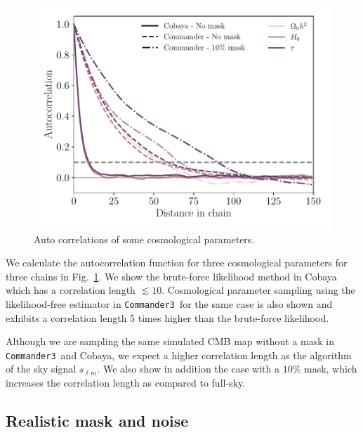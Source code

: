 \documentclass[twocolumn]{../common/aa}
\def\commanderthree{\texttt{Commander3}}
\begin{document}
\begin{figure}
	\centering
	\includegraphics[width=\linewidth]{figures/auto_correlation.pdf}
	\caption{\label{fig:autocorrelation}Auto correlations of some cosmological parameters.}
\end{figure}

We calculate the autocorrelation function for three cosmological parameters for three chains in Fig.~\ref{fig:autocorrelation}. We show the brute-force likelihood method in Cobaya which has a correlation length $\lesssim 10$. Cosmological parameter sampling using the likelihood-free estimator in \commanderthree\ for the same case is also shown and exhibits a correlation length 5 times higher than the brute-force likelihood.

Although we are sampling the same simulated CMB map without a mask in \commanderthree\ and Cobaya, we expect a higher correlation length as the algorithm of \citet{raccine:2016}  the sky signal $s_{\ell m}$. We also show in addition the case with a $10\%$ mask, which increases the correlation length as compared to full-sky.

\subsection{Realistic mask and noise}
\end{document}
